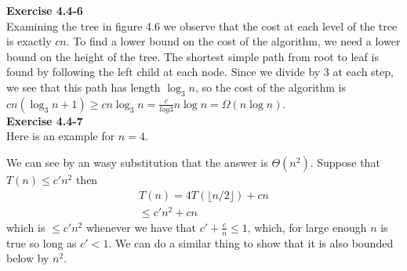 \documentclass{article}
\begin{document}
\noindent\textbf{Exercise 4.4-6}\\

Examining the tree in figure 4.6 we observe that the cost at each level of the tree is exactly $cn$.  To find a lower bound on the cost of the algorithm, we need a lower bound on the height of the tree.  The shortest simple path from root to leaf is found by following the left child at each node.  Since we divide by 3 at each step, we see that this path has length $\log_3 n$, so the cost of the algorithm is $cn(\log_3 n + 1) \geq cn\log_3 n = \frac{c}{log 3} n \log n = \Omega(n \log n)$. \\

\noindent\textbf{Exercise 4.4-7}\\

Here is an example for $n=4$.



We can see by an wasy substitution that the answer is $\Theta(n^2)$. Suppose that $T(n) \le c' n^2$ then
\begin{align*}
T(n) = 4T(\lfloor n/2\rfloor) + cn\\
\le c' n^2 + cn
\end{align*}
which is $\le c'n^2$ whenever we have that $c' + \frac{c}{n} \le 1$, which, for large enough $n$ is true so long as $c' <1$. We can do a similar thing to show that it is also bounded below by $n^2$.\\
\end{document}
